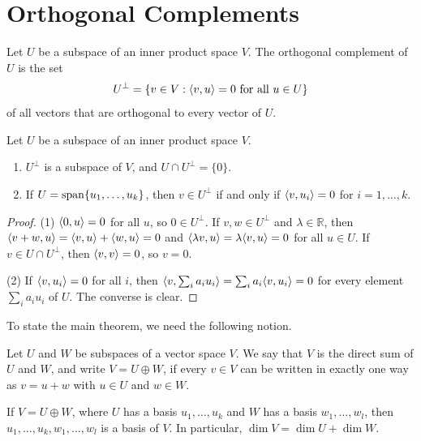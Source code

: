 \section{Orthogonal Complements}

\begin{definition}
    Let $U$ be a subspace of an inner product space $V$. The orthogonal complement of $U$ is the set
    \[U^\perp = \{v \in V : \langle v, u \rangle = 0 \text{ for all } u \in U\}\]
    of all vectors that are orthogonal to every vector of $U$.
\end{definition}

\begin{lemma}\label{L2-lem:complement}
    Let $U$ be a subspace of an inner product space $V$.
    \begin{enumerate}
        \item $U^\perp$ is a subspace of $V$, and $U \cap U^\perp = \{0\}$.
        \item If $U = \operatorname{span}\{u_1, \ldots, u_k\}$, then $v \in U^\perp$ if and only if $\langle v, u_i \rangle = 0$ for $i = 1, \ldots, k$.
    \end{enumerate}
\end{lemma}

\begin{proof}
    (1) $\langle 0, u \rangle = 0$ for all $u$, so $0 \in U^\perp$. If $v, w \in U^\perp$ and $\lambda \in \mathbb{R}$, then $\langle v + w, u \rangle = \langle v, u \rangle + \langle w, u \rangle = 0$ and $\langle \lambda v, u \rangle = \lambda \langle v, u \rangle = 0$ for all $u \in U$. If $v \in U \cap U^\perp$, then $\langle v, v \rangle = 0$, so $v = 0$.

    (2) If $\langle v, u_i \rangle = 0$ for all $i$, then $\langle v, \sum_i a_i u_i \rangle = \sum_i a_i \langle v, u_i \rangle = 0$ for every element $\sum_i a_i u_i$ of $U$. The converse is clear.
\end{proof}

To state the main theorem, we need the following notion.

\begin{definition}
    Let $U$ and $W$ be subspaces of a vector space $V$. We say that $V$ is the direct sum of $U$ and $W$, and write $V = U \oplus W$, if every $v \in V$ can be written in exactly one way as $v = u + w$ with $u \in U$ and $w \in W$.
\end{definition}

\begin{lemma}\label{L2-lem:direct-sum-dim}
    If $V = U \oplus W$, where $U$ has a basis $u_1, \ldots, u_k$ and $W$ has a basis $w_1, \ldots, w_l$, then $u_1, \ldots, u_k, w_1, \ldots, w_l$ is a basis of $V$. In particular, $\dim V = \dim U + \dim W$.
\end{lemma}

